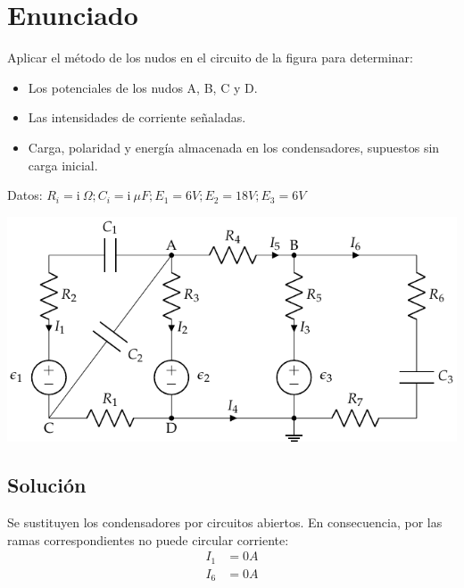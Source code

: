 
\section{Enunciado}
Aplicar el método de los nudos en el circuito de la figura para
determinar:
\begin{itemize}
\item Los potenciales de los nudos A, B, C y D.
\item Las intensidades de corriente señaladas.
\item Carga, polaridad y energía almacenada en los condensadores,
  supuestos sin carga inicial.
\end{itemize}
Datos:
$R_i = \mathrm{i\ } \Omega; C_i = \mathrm{i\ } \mu F; E_1 = 6V; E_2 =
18 V; E_3 = {6} V$

\begin{center}
  \includegraphics[]{figuras/nudos_condensadores.pdf}
\end{center}

\subsection*{Solución}
Se sustituyen los condensadores por circuitos abiertos. En
consecuencia, por las ramas correspondientes no puede circular
corriente:
\begin{align*}
  I_1 &= 0A\\
  I_6 &= 0 A
\end{align*}

